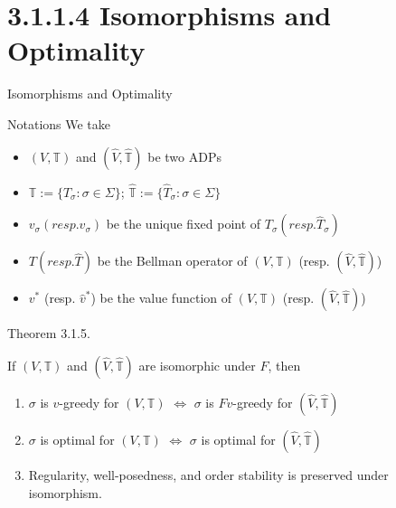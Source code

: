 \section{3.1.1.4 Isomorphisms and Optimality}
\begin{frame}{Isomorphisms and Optimality}
    
\end{frame}

\begin{frame}{Notations}
    We take
    \begin{itemize}
        \item $(V,\mathbb{T})$ and $(\hat V,\hat{\mathbb{T}})$ be two ADPs
        \item $\mathbb{T} := \{T_\sigma: \sigma\in\Sigma\}$; $\hat{\mathbb{T}}:=\{\hat T_\sigma: \sigma \in\Sigma\}$
        \item $v_\sigma (resp. \hat v_\sigma)$ be the unique fixed point of $T_\sigma (resp. \hat T_\sigma)$
        \item $T(resp. \hat T)$ be the Bellman operator of $(V,\mathbb{T})$ (resp. $(\hat V,\hat{\mathbb{T}})$)
        \item $v^*$ (resp. $\hat v^*$) be the value function of $(V,\mathbb{T})$ (resp. $(\hat V,\hat{\mathbb{T}})$)
    \end{itemize}
\end{frame}

\begin{frame}{Theorem 3.1.5.}
\begin{theorem}
    If $(V,\mathbb{T})$ and $(\hat V,\hat{\mathbb{T}})$ are isomorphic under $F$, then
    \begin{enumerate}
        \item $\sigma$ is $v$-greedy  for $(V,\mathbb{T})$ $\iff$ $\sigma$ is $Fv$-greedy for $(\hat V,\hat{\mathbb{T}})$
         \item $\sigma$ is optimal  for $(V,\mathbb{T})$ $\iff$ $\sigma$ is optimal for $(\hat V,\hat{\mathbb{T}})$
        \item Regularity, well-posedness, and order stability is preserved under isomorphism.
    \end{enumerate}
\end{theorem}
    
\end{frame}